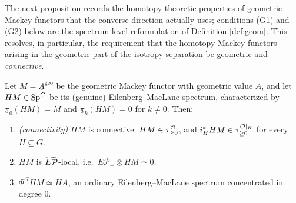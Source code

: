 The next proposition records the homotopy-theoretic properties of geometric
Mackey functors that the converse direction actually uses; conditions (G1) and
(G2) below are the spectrum-level reformulation of Definition \ref{def:geom}.
This resolves, in particular, the requirement that the homotopy Mackey functors
arising in the geometric part of the isotropy separation be geometric and
\emph{connective}.

\begin{qfiveproposition}\label{prop:geomEM}
Let $M=\underline A^{\mathrm{geo}}$ be the geometric Mackey functor with geometric
value $A$, and let $HM\in\mathrm{Sp}^G$ be its (genuine) Eilenberg--MacLane
spectrum, characterized by $\underline\pi_0(HM)=M$ and $\underline\pi_k(HM)=0$
for $k\ne 0$. Then:
\begin{enumerate}\setlength\itemsep{3pt}
\item[(C)] \emph{(connectivity)} $HM$ is connective: $HM\in\tau^{\mathcal{O}}_{\ge 0}$, and
$i_H^\ast HM\in\tau^{\mathcal{O}|_H}_{\ge 0}$ for every $H\subseteq G$.
\item[(G1)] $HM$ is $\widetilde{E\mathcal P}$-local, i.e.\ $E\mathcal P_+\otimes HM\simeq 0$.
\item[(G2)] $\Phi^G HM\simeq HA$, an ordinary Eilenberg--MacLane spectrum
concentrated in degree $0$.
\end{enumerate}
\end{qfiveproposition}

